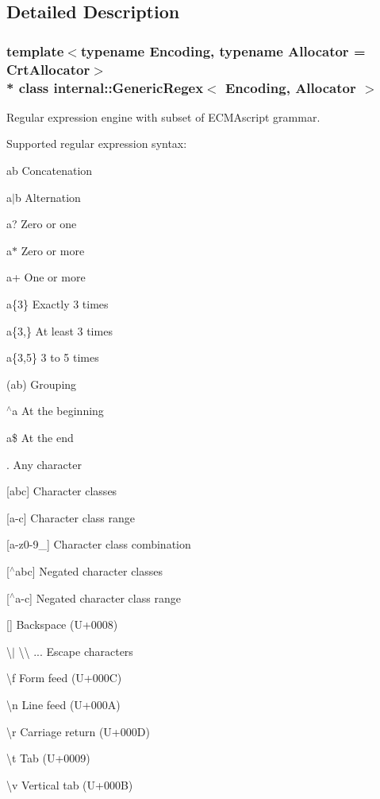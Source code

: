 \subsection{Detailed Description}
\subsubsection*{template$<$typename Encoding, typename Allocator = Crt\+Allocator$>$\\*
class internal\+::\+Generic\+Regex$<$ Encoding, Allocator $>$}

Regular expression engine with subset of E\+C\+M\+Ascript grammar. 

Supported regular expression syntax\+:
\begin{DoxyItemize}
\item {\ttfamily ab} Concatenation
\item {\ttfamily a$\vert$b} Alternation
\item {\ttfamily a}? Zero or one
\item {\ttfamily a$\ast$} Zero or more
\item {\ttfamily a+} One or more
\item {\ttfamily a\{3\}} Exactly 3 times
\item {\ttfamily a\{3},\} At least 3 times
\item {\ttfamily a\{3},5\} 3 to 5 times
\item {\ttfamily }(ab) Grouping
\item {\ttfamily $^\wedge$a} At the beginning
\item {\ttfamily a\$} At the end
\item {\ttfamily }. Any character
\item {\ttfamily }\mbox{[}abc\mbox{]} Character classes
\item {\ttfamily }\mbox{[}a-\/c\mbox{]} Character class range
\item {\ttfamily }\mbox{[}a-\/z0-\/9\+\_\+\mbox{]} Character class combination
\item {\ttfamily }\mbox{[}$^\wedge$abc\mbox{]} Negated character classes
\item {\ttfamily }\mbox{[}$^\wedge$a-\/c\mbox{]} Negated character class range
\item {\ttfamily }\mbox{[}{\bfseries }\mbox{]} Backspace (U+0008)
\item {\ttfamily \textbackslash{}}$\vert$ \textbackslash{}\textbackslash{} ... Escape characters
\item {\ttfamily \textbackslash{}f} Form feed (U+000C)
\item {\ttfamily \textbackslash{}n} Line feed (U+000A)
\item {\ttfamily \textbackslash{}r} Carriage return (U+000D)
\item {\ttfamily \textbackslash{}t} Tab (U+0009)
\item {\ttfamily \textbackslash{}v} Vertical tab (U+000B)
\end{DoxyItemize}

